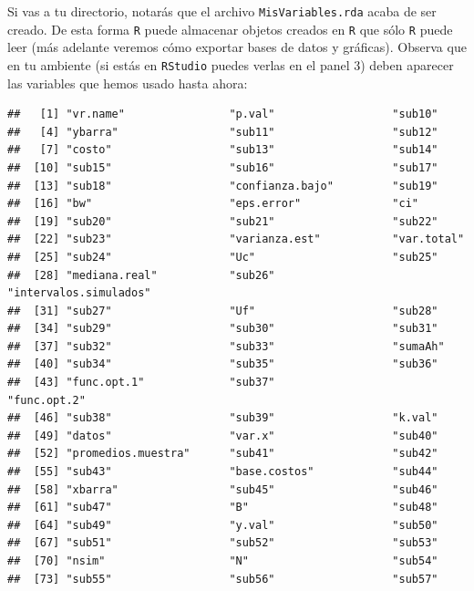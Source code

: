 \documentclass[
]{book}
\begin{document}
Si vas a tu directorio, notarás que el archivo \texttt{MisVariables.rda} acaba de ser creado. De esta forma \texttt{R} puede almacenar objetos creados en \texttt{R} que sólo \texttt{R} puede leer (más adelante veremos cómo exportar bases de datos y gráficas). Observa que en tu ambiente (si estás en \texttt{RStudio} puedes verlas en el panel 3) deben aparecer las variables que hemos usado hasta ahora:

\begin{verbatim}
##   [1] "vr.name"                "p.val"                  "sub10"                 
##   [4] "ybarra"                 "sub11"                  "sub12"                 
##   [7] "costo"                  "sub13"                  "sub14"                 
##  [10] "sub15"                  "sub16"                  "sub17"                 
##  [13] "sub18"                  "confianza.bajo"         "sub19"                 
##  [16] "bw"                     "eps.error"              "ci"                    
##  [19] "sub20"                  "sub21"                  "sub22"                 
##  [22] "sub23"                  "varianza.est"           "var.total"             
##  [25] "sub24"                  "Uc"                     "sub25"                 
##  [28] "mediana.real"           "sub26"                  "intervalos.simulados"  
##  [31] "sub27"                  "Uf"                     "sub28"                 
##  [34] "sub29"                  "sub30"                  "sub31"                 
##  [37] "sub32"                  "sub33"                  "sumaAh"                
##  [40] "sub34"                  "sub35"                  "sub36"                 
##  [43] "func.opt.1"             "sub37"                  "func.opt.2"            
##  [46] "sub38"                  "sub39"                  "k.val"                 
##  [49] "datos"                  "var.x"                  "sub40"                 
##  [52] "promedios.muestra"      "sub41"                  "sub42"                 
##  [55] "sub43"                  "base.costos"            "sub44"                 
##  [58] "xbarra"                 "sub45"                  "sub46"                 
##  [61] "sub47"                  "B"                      "sub48"                 
##  [64] "sub49"                  "y.val"                  "sub50"                 
##  [67] "sub51"                  "sub52"                  "sub53"                 
##  [70] "nsim"                   "N"                      "sub54"                 
##  [73] "sub55"                  "sub56"                  "sub57"                 

\end{verbatim}
\end{document}
